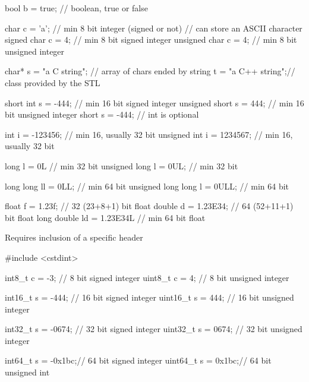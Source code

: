 \begin{frame}[fragile]
  \begin{cppcode}
    bool b = true;            // boolean, true or false

    char c = 'a';             // min 8 bit integer (signed or not)
                              // can store an ASCII character
    signed char c = 4;        // min 8 bit signed integer
    unsigned char c = 4;      // min 8 bit unsigned integer

    char* s = "a C string";   // array of chars ended by \0
    string t = "a C++ string";// class provided by the STL

    short int s = -444;       // min 16 bit signed integer
    unsigned short s = 444;   // min 16 bit unsigned integer
    short s = -444;           // int is optional
  \end{cppcode}
\end{frame}
\begin{frame}[fragile]
  \begin{cppcode}
    int i = -123456;          // min 16, usually 32 bit
    unsigned int i = 1234567; // min 16, usually 32 bit

    long l = 0L               // min 32 bit
    unsigned long l = 0UL;    // min 32 bit

    long long ll = 0LL;          // min 64 bit
    unsigned long long l = 0ULL; // min 64 bit

    float f = 1.23f;          // 32 (23+8+1) bit float
    double d = 1.23E34;       // 64 (52+11+1) bit float
    long double ld = 1.23E34L // min 64 bit float
  \end{cppcode}
\end{frame}

\begin{frame}[fragile]
  \alert{Requires inclusion of a specific header}
  \begin{cppcode}
    #include <cstdint>

    int8_t c = -3;     // 8 bit signed integer
    uint8_t c = 4;     // 8 bit unsigned integer

    int16_t s = -444;  // 16 bit signed integer
    uint16_t s = 444;  // 16 bit unsigned integer

    int32_t s = -0674; // 32 bit signed integer
    uint32_t s = 0674; // 32 bit unsigned integer

    int64_t s = -0x1bc;// 64 bit signed integer
    uint64_t s = 0x1bc;// 64 bit unsigned int
    \end{cppcode}
\end{frame}

